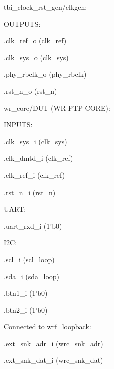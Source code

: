 \begin{dig}
\item tbi\_clock\_rst\_gen/clkgen:
    \begin{dig}
    \item OUTPUTS:
        \begin{dig}
        \item .clk\_ref\_o                    (clk\_ref)
        \item .clk\_sys\_o                    (clk\_sys)
        \item .phy\_rbclk\_o                  (phy\_rbclk)
        \item .rst\_n\_o                      (rst\_n)
        \end{dig}
    \end{dig}
\item wr\_core/DUT (WR PTP CORE):
    \begin{dig}
    \item INPUTS:
        \begin{dig}
        \item .clk\_sys\_i                    (clk\_sys)
        \item .clk\_dmtd\_i                   (clk\_ref)
        \item .clk\_ref\_i                    (clk\_ref)
        \item .rst\_n\_i                      (rst\_n)
        \item UART:
            \begin{dig}
            \item .uart\_rxd\_i                   (1'b0)
            \end{dig}
        \item I2C:
            \begin{dig}
            \item .scl\_i                      (scl\_loop)
            \item .sda\_i                      (sda\_loop)
            \end{dig}
        \item .btn1\_i                     (1'b0)
        \item .btn2\_i                     (1'b0)
        \item Connected to wrf\_loopback:
            \begin{dig}
            \item .ext\_snk\_adr\_i              (wrc\_snk\_adr)
            \item .ext\_snk\_dat\_i              (wrc\_snk\_dat)

\end{dig}
\end{dig}
\end{dig}
\end{dig}
